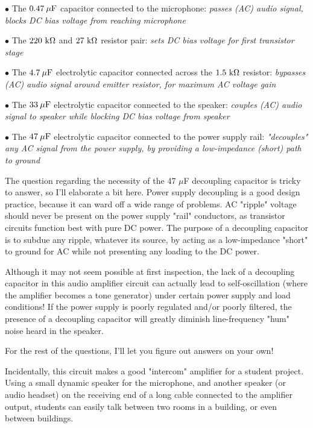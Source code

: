 \medskip
\item{$\bullet$} The $0.47 \> \mu \hbox{F}$ capacitor connected to the microphone: {\it passes (AC) audio signal, blocks DC bias voltage from reaching microphone}
\item{$\bullet$} The $220 \hbox{ k} \Omega$ and $27 \hbox{ k} \Omega$ resistor pair: {\it sets DC bias voltage for first transistor stage}
\item{$\bullet$} The $4.7 \> \mu \hbox{F}$ electrolytic capacitor connected across the $1.5 \hbox{ k} \Omega$ resistor: {\it bypasses (AC) audio signal around emitter resistor, for maximum AC voltage gain}
\item{$\bullet$} The $33 \> \mu \hbox{F}$ electrolytic capacitor connected to the speaker: {\it couples (AC) audio signal to speaker while blocking DC bias voltage from speaker}
\item{$\bullet$} The $47 \> \mu \hbox{F}$ electrolytic capacitor connected to the power supply rail: {\it "decouples" any AC signal from the power supply, by providing a low-impedance (short) path to ground}
\medskip

The question regarding the necessity of the 47 $\mu$F decoupling capacitor is tricky to answer, so I'll elaborate a bit here.  Power supply decoupling is a good design practice, because it can ward off a wide range of problems.  AC "ripple" voltage should never be present on the power supply "rail" conductors, as transistor circuits function best with pure DC power.  The purpose of a decoupling capacitor is to subdue any ripple, whatever its source, by acting as a low-impedance "short" to ground for AC while not presenting any loading to the DC power.  

Although it may not seem possible at first inspection, the lack of a decoupling capacitor in this audio amplifier circuit can actually lead to self-oscillation (where the amplifier becomes a tone generator) under certain power supply and load conditions!  If the power supply is poorly regulated and/or poorly filtered, the presence of a decoupling capacitor will greatly diminish line-frequency "hum" noise heard in the speaker.

For the rest of the questions, I'll let you figure out answers on your own!







Incidentally, this circuit makes a good "intercom" amplifier for a student project.  Using a small dynamic speaker for the microphone, and another speaker (or audio headset) on the receiving end of a long cable connected to the amplifier output, students can easily talk between two rooms in a building, or even between buildings.





